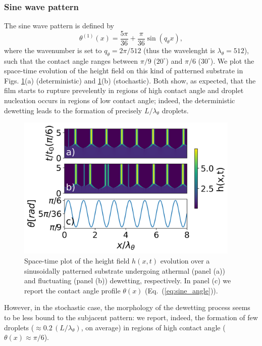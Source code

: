 \subsubsection{Sine wave pattern}\label{subsubsec:sine}
The sine wave pattern is defined by
\begin{equation}\label{eq:sine_angle}
    {\theta^{(1)}}(x) = \frac{5\pi}{36} + \frac{\pi}{36} \sin\left(q_{\theta} x\right),
\end{equation}
where the wavenumber is set to $q_{\theta} = 2\pi/512$ (thus the wavelenght is $\lambda_{\theta}=512$), such that the contact angle ranges between $\pi/9$ ($20^{\circ}$) and $\pi/6$ ($30^{\circ}$).
We plot the space-time evolution of the height field on this kind of patterned substrate in Figs. \ref{fig:patterned_sine8_difference_20-30}(a) (deterministic) and  \ref{fig:patterned_sine8_difference_20-30}(b) (stochastic). 
Both show, as expected, that the film starts to rupture prevelently in regions of high contact angle and droplet nucleation occurs in regions of low contact angle; indeed, the deterministic dewetting leads to the formation of precisely $L/\lambda_{\theta}$ droplets.
\begin{figure}
    \centering
    \includegraphics[width=0.95\textwidth]{graphics/spacedepCA_['sine', '1e7', '10', 25, '9_3', 10000000.0]_v2.png}
    \caption{Space-time plot of the height field $h(x,t)$ evolution over a sinusoidally patterned substrate undergoing athermal 
    (panel (a)) and fluctuating (panel (b)) dewetting, respectively. In panel (c) we report the contact angle profile $\theta(x)$ (Eq.~(\ref{eq:sine_angle})).} 
    \label{fig:patterned_sine8_difference_20-30}
\end{figure}
However, in the stochastic case, the morphology of the dewetting process seems to be less bound to the subjacent pattern: we report, indeed, the formation of few droplets ($\approx 0.2 \, (L/\lambda_{\theta})$, on average) in regions of high contact angle ($\theta(x) \approx \pi/6$).
